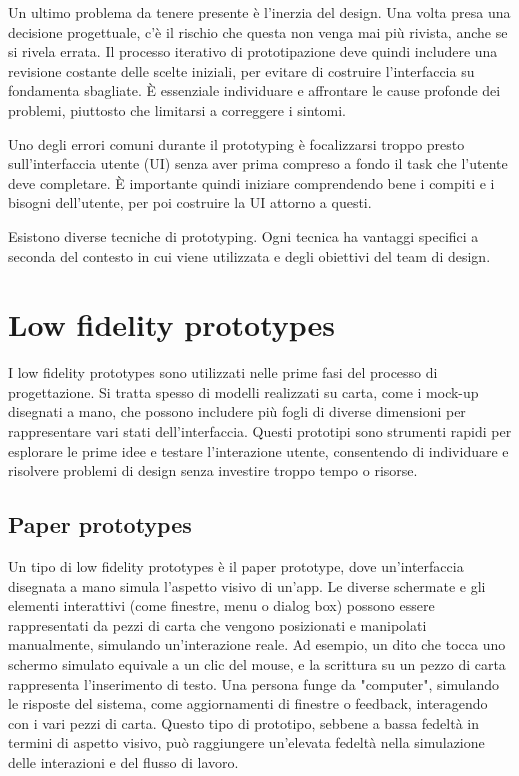 Un ultimo problema da tenere presente è l'inerzia del design. Una volta presa una decisione progettuale, c'è il rischio che questa non venga mai più rivista, anche se si rivela errata. Il processo iterativo di prototipazione deve quindi includere una revisione costante delle scelte iniziali, per evitare di costruire l'interfaccia su fondamenta sbagliate. È essenziale individuare e affrontare le cause profonde dei problemi, piuttosto che limitarsi a correggere i sintomi.

Uno degli errori comuni durante il prototyping è focalizzarsi troppo presto sull’interfaccia utente (UI) senza aver prima compreso a fondo il task che l'utente deve completare. È importante quindi iniziare comprendendo bene i compiti e i bisogni dell’utente, per poi costruire la UI attorno a questi.

Esistono diverse tecniche di prototyping. Ogni tecnica ha vantaggi specifici a seconda del contesto in cui viene utilizzata e degli obiettivi del team di design.

\section{Low fidelity prototypes}
I low fidelity prototypes sono utilizzati nelle prime fasi del processo di progettazione. Si tratta spesso di modelli realizzati su carta, come i mock-up disegnati a mano, che possono includere più fogli di diverse dimensioni per rappresentare vari stati dell’interfaccia. Questi prototipi sono strumenti rapidi per esplorare le prime idee e testare l’interazione utente, consentendo di individuare e risolvere problemi di design senza investire troppo tempo o risorse.

\subsection{Paper prototypes}
Un tipo di low fidelity prototypes è il paper prototype, dove un’interfaccia disegnata a mano simula l’aspetto visivo di un’app. Le diverse schermate e gli elementi interattivi (come finestre, menu o dialog box) possono essere rappresentati da pezzi di carta che vengono posizionati e manipolati manualmente, simulando un’interazione reale. Ad esempio, un dito che tocca uno schermo simulato equivale a un clic del mouse, e la scrittura su un pezzo di carta rappresenta l'inserimento di testo. Una persona funge da "computer", simulando le risposte del sistema, come aggiornamenti di finestre o feedback, interagendo con i vari pezzi di carta. Questo tipo di prototipo, sebbene a bassa fedeltà in termini di aspetto visivo, può raggiungere un'elevata fedeltà nella simulazione delle interazioni e del flusso di lavoro.

